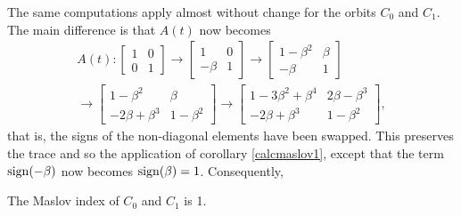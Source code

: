 The same computations apply almost without change for the orbits $C_0$ and $C_1$. The main difference is that $A(t)$ now becomes
\begin{equation}
\begin{multlined}
A(t) :
\begin{bmatrix}
1 & 0\\
0 & 1
\end{bmatrix}
\to
\begin{bmatrix}
1 & 0\\
-\beta & 1
\end{bmatrix}
\to
\begin{bmatrix}
1 - \beta^2 &  \beta \\
-\beta & 1
\end{bmatrix}\\
\to
\begin{bmatrix}
1 - \beta^2 &  \beta \\
-2 \beta + \beta^3 & 1 - \beta^2
\end{bmatrix}
\to
\begin{bmatrix}
1 - 3 \beta^2 + \beta^4 &  2 \beta - \beta^3 \\
-2 \beta + \beta^3 & 1 - \beta^2
\end{bmatrix},
\end{multlined}
\end{equation}
that is, the signs of the non-diagonal elements have been swapped. This preserves the trace and so the application of corollary \ref{calcmaslov1}, except that the term $\operatorname{sign}(-\beta)$ now becomes $\operatorname{sign}(\beta) = 1$. Consequently,

\begin{prop}
The Maslov index of $C_0$ and $C_1$ is 1.
\end{prop}

